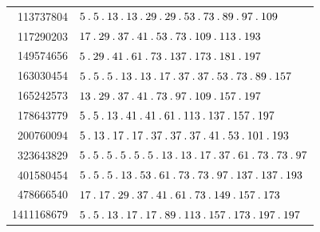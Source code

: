 \begin{longtable}{@{}r|l@{}}
113737804 & $5\pdot 5\pdot 13\pdot 13\pdot 29\pdot 29\pdot 53\pdot 73\pdot 89\pdot 97\pdot 109$\\
117290203 & $17\pdot 29\pdot 37\pdot 41\pdot 53\pdot 73\pdot 109\pdot 113\pdot 193$\\
149574656 & $5\pdot 29\pdot 41\pdot 61\pdot 73\pdot 137\pdot 173\pdot 181\pdot 197$\\
163030454 & $5\pdot 5\pdot 5\pdot 13\pdot 13\pdot 17\pdot 37\pdot 37\pdot 53\pdot 73\pdot 89\pdot 157$\\
165242573 & $13\pdot 29\pdot 37\pdot 41\pdot 73\pdot 97\pdot 109\pdot 157\pdot 197$\\
178643779 & $5\pdot 5\pdot 13\pdot 41\pdot 41\pdot 61\pdot 113\pdot 137\pdot 157\pdot 197$\\
200760094 & $5\pdot 13\pdot 17\pdot 17\pdot 37\pdot 37\pdot 37\pdot 41\pdot 53\pdot 101\pdot 193$\\
323643829 & $5\pdot 5\pdot 5\pdot 5\pdot 5\pdot 5\pdot 13\pdot 13\pdot 17\pdot 37\pdot 61\pdot 73\pdot 73\pdot 97$\\
401580454 & $5\pdot 5\pdot 5\pdot 13\pdot 53\pdot 61\pdot 73\pdot 73\pdot 97\pdot 137\pdot 137\pdot 193$\\
478666540 & $17\pdot 17\pdot 29\pdot 37\pdot 41\pdot 61\pdot 73\pdot 149\pdot 157\pdot 173$\\
1411168679 & $5\pdot 5\pdot 13\pdot 17\pdot 17\pdot 89\pdot 113\pdot 157\pdot 173\pdot 197\pdot 197$\\
\end{longtable}\endgroup
\par\medskip\begingroup\small\setlength{\tabcolsep}{5pt}
